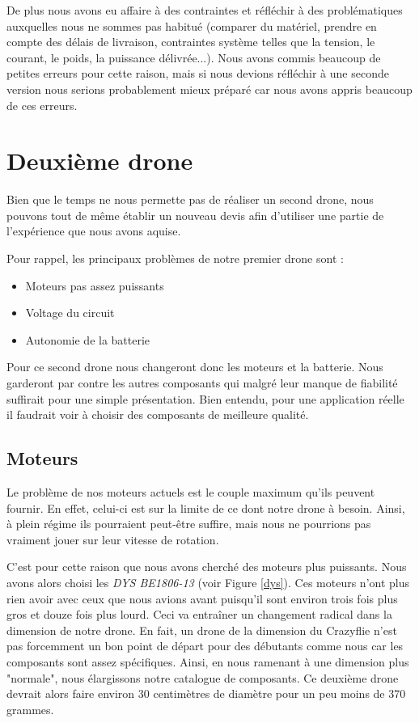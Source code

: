 \documentclass[a4paper,10pt]{report}
\begin{document}
      De plus nous avons eu affaire à des contraintes et réfléchir à des 
problématiques auxquelles nous ne sommes pas habitué (comparer du matériel, 
prendre en compte des délais de livraison, contraintes système telles que la 
tension, le courant, le poids, la puissance délivrée...). Nous avons commis 
beaucoup de petites erreurs pour cette raison, mais si nous devions réfléchir à 
une seconde version nous serions probablement mieux préparé car nous avons 
appris beaucoup de ces erreurs.
  
  \chapter{Deuxième drone}
    Bien que le temps ne nous permette pas de réaliser un second drone, nous 
pouvons tout de même établir un nouveau devis afin d'utiliser une partie de 
l'expérience que nous avons aquise.

    Pour rappel, les principaux problèmes de notre premier drone sont :
    
      \begin{itemize}
	\item Moteurs pas assez puissants
	\item Voltage du circuit
	\item Autonomie de la batterie
      \end{itemize}
      
   Pour ce second drone nous changeront donc les moteurs et la batterie. Nous 
garderont par contre les autres composants qui malgré leur manque de fiabilité 
suffirait pour une simple présentation. Bien entendu, pour une application 
réelle il faudrait voir à choisir des composants de meilleure qualité.

    \section{Moteurs}
      Le problème de nos moteurs actuels est le couple maximum qu'ils peuvent 
fournir. En effet, celui-ci est sur la limite de ce dont notre drone à besoin. 
Ainsi, à plein régime ils pourraient peut-être suffire, mais nous ne pourrions 
pas vraiment jouer sur leur vitesse de rotation. 

      C'est pour cette raison que nous avons cherché des moteurs plus 
puissants. Nous avons alors choisi les \textit{DYS BE1806-13} (voir Figure 
\ref{dys}). Ces moteurs n'ont plus rien avoir avec ceux que nous avions avant 
puisqu'il sont environ trois fois plus gros et douze fois plus lourd. Ceci va 
entraîner un changement radical dans la dimension de notre drone. En fait, un 
drone de la dimension du Crazyflie n'est pas forcemment un bon point de départ 
pour des débutants comme nous car les composants sont assez spécifiques. Ainsi, 
en nous ramenant à une dimension plus "normale", nous élargissons notre 
catalogue de composants. Ce deuxième drone devrait alors faire environ 30 
centimètres de diamètre pour un peu moins de 370 grammes.
\end{document}
